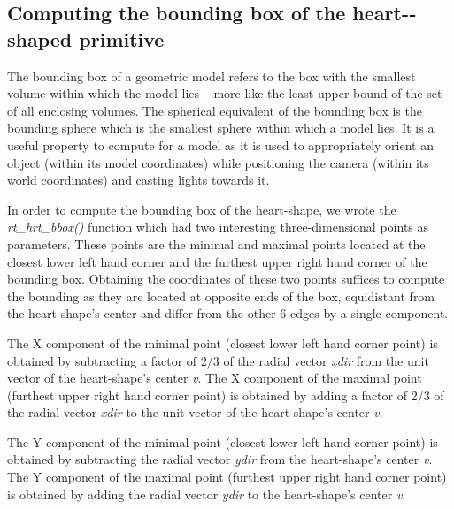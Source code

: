 \subsection{Computing the bounding box of the heart-­shaped primitive}

The   bounding   box   of   a   geometric   model   refers   to   the   box   with   the  
smallest   volume   within   which   the   model   lies   –   more   like   the   least   upper   bound  
of   the   set   of   all   enclosing   volumes.   The   spherical   equivalent   of   the   bounding  
box   is   the   bounding   sphere   which   is   the   smallest   sphere   within   which   a   model  
lies.   It   is   a   useful   property   to   compute   for   a   model   as   it   is   used   to   appropriately  
orient   an   object   (within   its   model   coordinates)   while   positioning   the   camera  
(within its world coordinates) and casting lights towards it.   

\hspace{30} In   order   to   compute   the   bounding   box   of   the   heart­-shape,   we   wrote   the  
\textit{rt\_hrt\_bbox()}   function   which   had   two   interesting   three­-dimensional   points   as  
parameters.   These   points   are   the   minimal   and   maximal   points   located   at   the  
closest   lower   left   hand   corner   and   the   furthest   upper   right   hand   corner   of   the  
bounding   box.   Obtaining   the   coordinates   of   these   two   points   suffices   to  
compute   the   bounding   as   they   are   located   at   opposite   ends   of   the   box,  
equidistant   from   the   heart-­shape's   center   and   differ   from   the   other   6   edges   by  
a single  component.  

\hspace{30} The   X   component   of   the   minimal   point   (closest   lower   left   hand   corner  
point) is obtained by subtracting a factor of 2/3 of the radial vector \textit{xdir} from the unit vector of the  
heart-­shape's center \textit{v}.   The   X   component   of   the   maximal   point (furthest upper right hand corner point) is obtained   by   adding  a factor of 2/3 of the radial vector \textit{xdir} to the unit vector of the heart-­shape's center \textit{v}.

\hspace{30}The Y component of the minimal point (closest lower left hand corner point) is obtained by subtracting the radial vector \textit{ydir} from the heart-­shape's center \textit{v}. The Y component of the maximal point (furthest upper right hand corner point) is obtained by adding the radial vector \textit{ydir} to the heart-­shape's center \textit{v}.    

